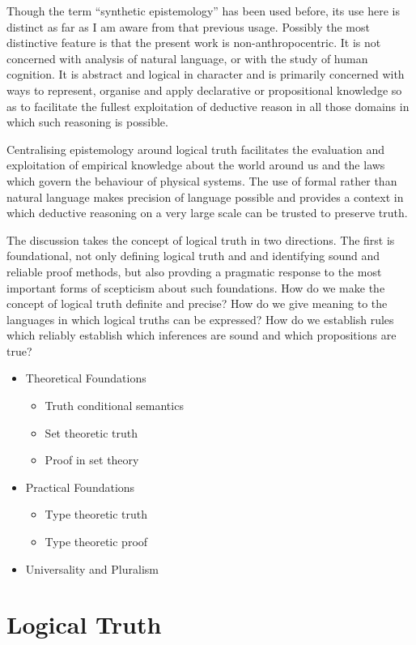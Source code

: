 \documentclass[10pt,titlepage]{book}
\begin{document}
Though the term ``synthetic epistemology'' has been used before, its use here is distinct as far as I am aware from that previous usage.
Possibly the most distinctive feature is that the present work is non-anthropocentric.
It is not concerned with analysis of natural language, or with the study of human cognition.
It is abstract and logical in character and is primarily concerned with ways to represent, organise and apply declarative or propositional knowledge so as to facilitate the fullest exploitation of deductive reason in all those domains in which such reasoning is possible.

Centralising epistemology around logical truth facilitates the evaluation and exploitation of empirical knowledge about the world around us and the laws which govern the behaviour of physical systems.
The use of formal rather than natural language makes precision of language possible and provides a context in which deductive reasoning on a very large scale can be trusted to preserve truth.

The discussion takes the concept of logical truth in two directions.
The first is foundational, not only defining logical truth and and identifying sound and reliable proof methods, but also provding a pragmatic response to the most important forms of scepticism about such foundations.
How do we make the concept of logical truth definite and precise?
How do we give meaning to the languages in which logical truths can be expressed?
How do we establish rules which reliably establish which inferences are sound and which propositions are true?

\begin{itemize}
\item Theoretical Foundations
  \begin{itemize}
    \item Truth conditional semantics
  \item Set theoretic truth
  \item Proof in set theory
  \end{itemize}
\item Practical Foundations
  \begin{itemize}
  \item Type theoretic truth
  \item Type theoretic proof
  \end{itemize}
\item Universality and Pluralism
  \end{itemize}

\chapter{Logical Truth}
\end{document}
